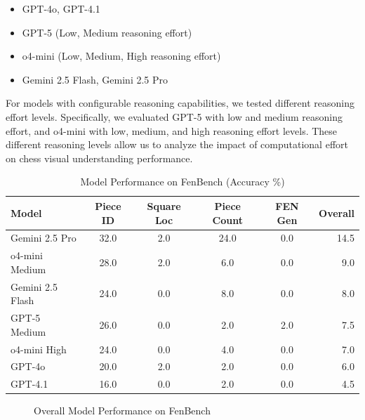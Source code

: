 \documentclass{article}
\begin{document}
\begin{itemize}
    \item GPT-4o, GPT-4.1 
    \item GPT-5 (Low, Medium reasoning effort)
    \item o4-mini (Low, Medium, High reasoning effort)  
    \item Gemini 2.5 Flash, Gemini 2.5 Pro
\end{itemize}

For models with configurable reasoning capabilities, we tested different reasoning effort levels. Specifically, we evaluated GPT-5 with low and medium reasoning effort, and o4-mini with low, medium, and high reasoning effort levels. These different reasoning levels allow us to analyze the impact of computational effort on chess visual understanding performance.

\begin{table}[h]
\centering
\caption{Model Performance on FenBench (Accuracy \%)}
\label{tab:results}
\begin{tabular}{lccccr}
\toprule
Model & Piece ID & Square Loc & Piece Count & FEN Gen & Overall \\
\midrule
Gemini 2.5 Pro & 32.0 & 2.0 & 24.0 & 0.0 & 14.5 \\
o4-mini Medium & 28.0 & 2.0 & 6.0 & 0.0 & 9.0 \\
Gemini 2.5 Flash & 24.0 & 0.0 & 8.0 & 0.0 & 8.0 \\
GPT-5 Medium & 26.0 & 0.0 & 2.0 & 2.0 & 7.5 \\
o4-mini High & 24.0 & 0.0 & 4.0 & 0.0 & 7.0 \\
GPT-4o & 20.0 & 2.0 & 2.0 & 0.0 & 6.0 \\
GPT-4.1 & 16.0 & 0.0 & 2.0 & 0.0 & 4.5 \\
\bottomrule
\end{tabular}
\end{table}

\begin{figure}[h]
\centering
{}
\caption{Overall Model Performance on FenBench}
\label{fig:model_performance}
\end{figure}
\end{document}
